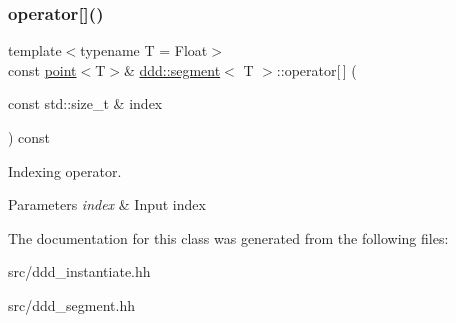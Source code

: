 \subsubsection{\texorpdfstring{operator[]()}{operator[]()}\hspace{0.1cm}{\footnotesize\ttfamily [2/2]}}
{\footnotesize\ttfamily template$<$typename T = Float$>$ \\
const \hyperlink{classddd_1_1point}{point}$<$T$>$\& \hyperlink{classddd_1_1segment}{ddd\+::segment}$<$ T $>$\+::operator\mbox{[}$\,$\mbox{]} (\begin{DoxyParamCaption}\item[{const std\+::size\+\_\+t \&}]{index }\end{DoxyParamCaption}) const\hspace{0.3cm}{\ttfamily [inline]}}



Indexing operator. 


\begin{DoxyParams}{Parameters}
{\em index} & Input index \\
\hline
\end{DoxyParams}


The documentation for this class was generated from the following files\+:\begin{DoxyCompactItemize}
\item 
src/ddd\+\_\+instantiate.\+hh\item 
src/ddd\+\_\+segment.\+hh\end{DoxyCompactItemize}
